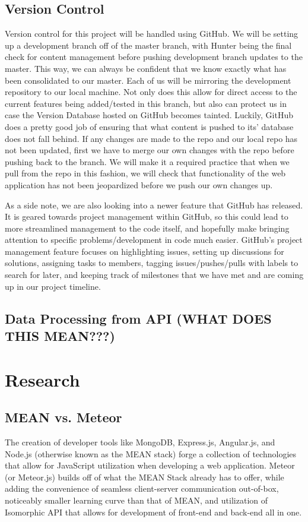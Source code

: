 \documentclass[12pt,a4paper]{report}
\begin{document}
	\section{Version Control}
	Version control for this project will be handled using GitHub. We will be setting up a development branch off of the master branch, with Hunter being the final check for content management before pushing development branch updates to the master. This way, we can always be confident that we know exactly what has been consolidated to our master. Each of us will be mirroring the development repository to our local machine. Not only does this allow for direct access to the current features being added/tested in this branch, but also can protect us in case the Version Database hosted on GitHub becomes tainted. Luckily, GitHub does a pretty good job of ensuring that what content is pushed to its' database does not fall behind. If any changes are made to the repo and our local repo has not been updated, first we have to merge our own changes with the repo before pushing back to the branch. We will make it a required practice that when we pull from the repo in this fashion, we will check that functionality of the web application has not been jeopardized before we push our own changes up. \par
	As a side note, we are also looking into a newer feature that GitHub has released. It is geared towards project management within GitHub, so this could lead to more streamlined management to the code itself, and hopefully make bringing attention to specific problems/development in code much easier. GitHub's project management feature focuses on highlighting issues, setting up discussions for solutions, assigning tasks to members, tagging issues/pushes/pulls with labels to search for later, and keeping track of milestones that we have met and are coming up in our project timeline.
	\section{Data Processing from API (WHAT DOES THIS MEAN???)}

\newpage
\chapter*{Research}
	\section{MEAN vs. Meteor}
	The creation of developer tools like MongoDB, Express.js, Angular.js, and Node.js (otherwise known as the MEAN stack) forge a collection of technologies that allow for JavaScript utilization when developing a web application. Meteor (or Meteor.js) builds off of what the MEAN Stack already has to offer, while adding the convenience of seamless client-server communication out-of-box, noticeably smaller learning curve than that of MEAN, and utilization of Isomorphic API that allows for development of front-end and back-end all in one.
	
\end{document}
